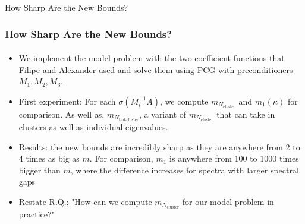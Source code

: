 \begin{frame}[label=sharpness]{How Sharp Are the New Bounds?}
    \frametitle{How Sharp Are the New Bounds?}
    \framesubtitle{}
        \begin{itemize}
            \item<1-> We implement the model problem with the two coefficient functions that Filipe and Alexander used and solve them using PCG with preconditioners $M_1, M_2, M_3$.
            \item<2-> First experiment: For each $\sigma(M_i^{-1}A)$, we compute $m_{N_{\text{cluster}}}$ and $m_1(\kappa)$ for comparison. As well as, $m_{N_{\text{tail-cluster}}}$, a variant of $m_{N_{\text{cluster}}}$ that can take in clusters as well as individual eigenvalues.
            \item<3-> Results: the new bounds are incredibly sharp as they are anywhere from 2 to 4 times as big as $m$. For comparison, $m_1$ is anywhere from 100 to 1000 times bigger than $m$, where the difference increases for spectra with larger spectral gaps
            \item<4-> Restate R.Q.: "How can we compute $m_{N_{\text{cluster}}}$ for our model problem in practice?"
        \end{itemize}
\end{frame}
